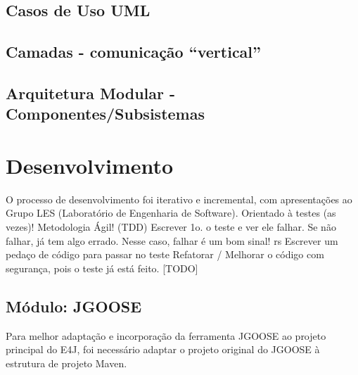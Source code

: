         \subsection{Casos de Uso UML}

        \subsection{Camadas - comunicação ``vertical''}

        \subsection{Arquitetura Modular - Componentes/Subsistemas}
            \label{cap:proposta-sec:maven} %
        

    \section{Desenvolvimento}
        \label{cap:proposta-sec:development}

        O processo de desenvolvimento foi iterativo e incremental, com apresentações ao Grupo LES (Laboratório de Engenharia de Software).
            Orientado à testes (as vezes)!
            Metodologia Ágil! (TDD)
                Escrever 1o. o teste e ver ele falhar. Se não falhar, já tem algo errado. Nesse caso, falhar é um bom sinal! rs
                Escrever um pedaço de código para passar no teste
                Refatorar / Melhorar o código com segurança, pois o teste já está feito.
            [TODO]
        \subsection{Módulo: JGOOSE}
            Para melhor adaptação e incorporação da ferramenta JGOOSE ao projeto principal do E4J,
                foi necessário adaptar o projeto original do JGOOSE à estrutura de projeto Maven.
        
